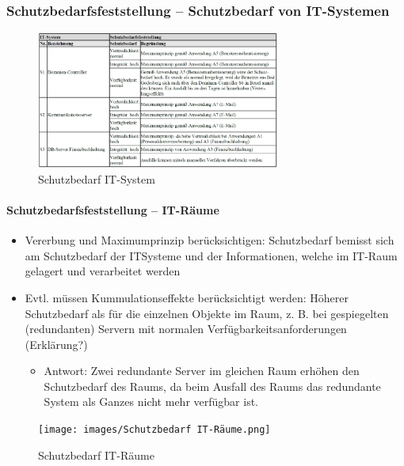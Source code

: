 \documentclass[10pt,a4paper]{article}
\begin{document}
\subsubsection*{Schutzbedarfsfeststellung – Schutzbedarf von IT-Systemen}
\begin{figure}[H]
    \begin{center}
    \includegraphics[width=8cm]{images/Schutzbedarf IT-System.png}
    \caption{Schutzbedarf IT-System}
    \label{Schutzbedarf IT-System}
    \end{center}
\end{figure}

\paragraph*{Schutzbedarfsfeststellung – IT-Räume}
\begin{itemize}[noitemsep,topsep=0pt,leftmargin=*]
    \item Vererbung und Maximumprinzip berücksichtigen:
    Schutzbedarf bemisst sich am Schutzbedarf der ITSysteme und der Informationen, welche im IT-Raum
    gelagert und verarbeitet werden
    \item Evtl. müssen Kummulationseffekte berücksichtigt
    werden: Höherer Schutzbedarf als für die einzelnen
    Objekte im Raum, z. B. bei gespiegelten
    (redundanten) Servern mit normalen
    Verfügbarkeitsanforderungen (Erklärung?)
    \begin{itemize}[noitemsep,topsep=0pt,leftmargin=*]
        \item Antwort: Zwei redundante Server im gleichen Raum erhöhen den Schutzbedarf des Raums, da beim Ausfall des Raums das redundante System als Ganzes nicht mehr verfügbar ist.
    \end{itemize}
\end{itemize}

\begin{figure}[H]
    \begin{center}
    \texttt{[image: images/Schutzbedarf IT-Räume.png]}
    \caption{Schutzbedarf IT-Räume}
    \label{Schutzbedarf IT-Räume}
    \end{center}
\end{figure}
\end{document}
